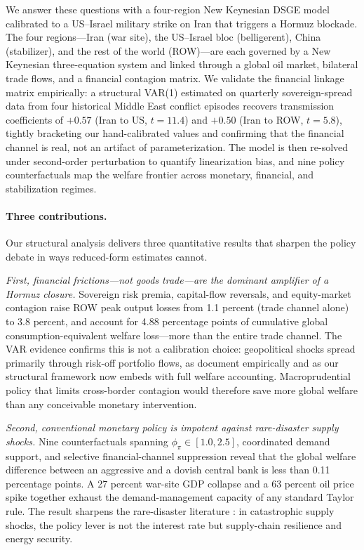 \documentclass[12pt]{article}
\begin{document}
We answer these questions with a four-region New Keynesian DSGE model calibrated to a US--Israel military strike on Iran that triggers a Hormuz blockade. The four regions---Iran (war site), the US--Israel bloc (belligerent), China (stabilizer), and the rest of the world (ROW)---are each governed by a New Keynesian three-equation system and linked through a global oil market, bilateral trade flows, and a financial contagion matrix. We validate the financial linkage matrix empirically: a structural VAR(1) estimated on quarterly sovereign-spread data from four historical Middle East conflict episodes recovers transmission coefficients of $+0.57$ (Iran to US, $t = 11.4$) and $+0.50$ (Iran to ROW, $t = 5.8$), tightly bracketing our hand-calibrated values and confirming that the financial channel is real, not an artifact of parameterization. The model is then re-solved under second-order perturbation to quantify linearization bias, and nine policy counterfactuals map the welfare frontier across monetary, financial, and stabilization regimes.

\paragraph{Three contributions.} Our structural analysis delivers three quantitative results that sharpen the policy debate in ways reduced-form estimates cannot.

\textit{First, financial frictions---not goods trade---are the dominant amplifier of a Hormuz closure.} Sovereign risk premia, capital-flow reversals, and equity-market contagion raise ROW peak output losses from 1.1 percent (trade channel alone) to 3.8 percent, and account for 4.88 percentage points of cumulative global consumption-equivalent welfare loss---more than the entire trade channel. The VAR evidence confirms this is not a calibration choice: geopolitical shocks spread primarily through risk-off portfolio flows, as \citet{caldara2022measuring} document empirically and as our structural framework now embeds with full welfare accounting. Macroprudential policy that limits cross-border contagion would therefore save more global welfare than any conceivable monetary intervention.

\textit{Second, conventional monetary policy is impotent against rare-disaster supply shocks.} Nine counterfactuals spanning $\phi_\pi \in [1.0, 2.5]$, coordinated demand support, and selective financial-channel suppression reveal that the global welfare difference between an aggressive and a dovish central bank is less than 0.11 percentage points. A 27 percent war-site GDP collapse and a 63 percent oil price spike together exhaust the demand-management capacity of any standard Taylor rule. The result sharpens the rare-disaster literature \citep{barro2006rare}: in catastrophic supply shocks, the policy lever is not the interest rate but supply-chain resilience and energy security.
\end{document}
